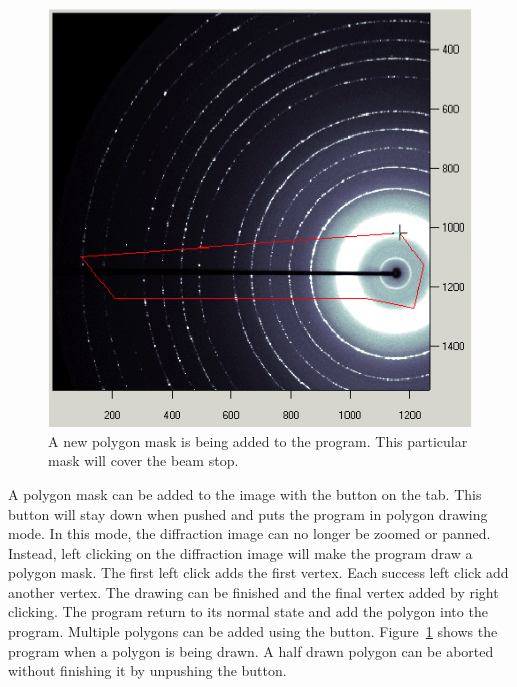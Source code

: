\begin{figure}
    \centering
    \includegraphics[scale=.75]{figures/Adding_Polygon.eps}
    \caption{A new polygon mask is being added to the 
    program. This particular mask will cover 
    the beam stop.}
    \label{Adding_Polygon}
\end{figure}

A polygon mask can be added to the image with
the  button on the  tab. 
This button will stay down when pushed and puts
the program in polygon drawing mode.  In this mode, the 
diffraction image can no longer be zoomed or panned.
Instead, left clicking on the diffraction image will make
the program draw a polygon mask.  The first left click adds the
first vertex. Each success left click add another vertex. 
The drawing can be finished and the final vertex added by right 
clicking. The program return to its
normal state and add the polygon into the program. 
Multiple polygons can be added using the 
button. Figure~\ref{Adding_Polygon} shows 
the program when a polygon is
being drawn. A half drawn polygon can be aborted without finishing
it by unpushing the  button.

